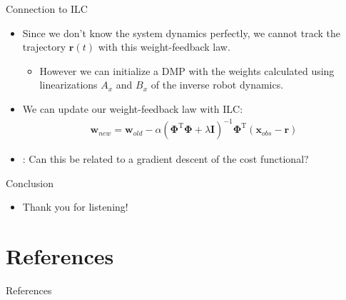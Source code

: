 \documentclass{beamer}
\newcommand{\todo}{\color{red}{TODO}} %
\newcommand{\basis}{\mathbf{\Phi}} %
\newcommand{\state}{\mathbf{x}} %
\newcommand{\traj}{\mathbf{r}} %
\newcommand{\weights}{\mathbf{w}} %
\begin{document}
%
\begin{frame}{Connection to ILC}
\begin{itemize}
\item Since we don't know the system dynamics perfectly, we cannot track the trajectory $\traj(t)$ with this weight-feedback law. \pause
\begin{itemize}
	\item However we can initialize a DMP with the weights calculated using linearizations $A_x$ and $B_x$ of the inverse robot dynamics. \pause
\end{itemize}
\item We can update our weight-feedback law with ILC: \pause
\begin{equation*}
\begin{aligned}
\weights_{new} = \weights_{old} - \alpha(\basis^{\mathrm{T}}\basis + \lambda\mathbf{I})^{-1}\basis^{\mathrm{T}}(\state_{obs} - \traj)
\end{aligned}
\end{equation*} \pause
\item \todo: Can this be related to a gradient descent of the cost functional?
\end{itemize}
\end{frame}	
%
\begin{frame}{Conclusion}
\begin{itemize}
\item Thank you for listening!
\end{itemize}
\end{frame}	
%
\section{References}
\begin{frame}[allowframebreaks]{References}
\def\newblock{\hskip .11em plus .33em minus .07em}

\end{frame}
%

%
\end{document}

